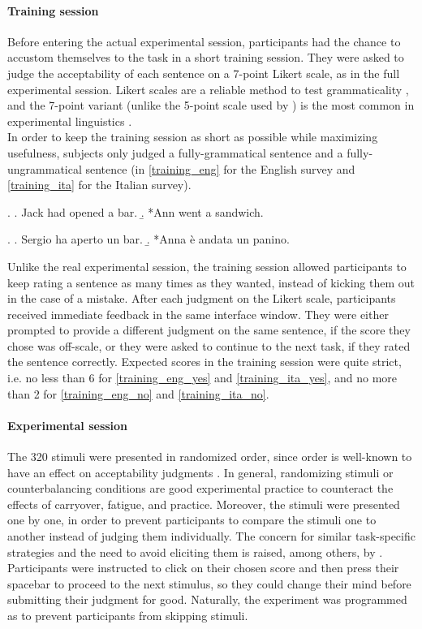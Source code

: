 \paragraph{Training session} Before entering the actual experimental session, participants had the chance to accustom themselves to the task in a short training session. They were asked to judge the acceptability of each sentence on a 7-point Likert scale, as in the full experimental session. Likert scales are a reliable method to test grammaticality \parencite{WeskottFanselow2011}, and the 7-point variant (unlike the 5-point scale used by \textcite{Medina2007}) is the most common in experimental linguistics \parencite{Juzek2016}.\\ In order to keep the training session as short as possible while maximizing usefulness, subjects only judged a fully-grammatical sentence and a fully-ungrammatical sentence (in \ref{training_eng} for the English survey and \ref{training_ita} for the Italian survey).

\ex. \label{training_eng} \a. \label{training_eng_yes} Jack had opened a bar.
\b. \label{training_eng_no} *Ann went a sandwich.

\ex. \label{training_ita} \a. \label{training_ita_yes} Sergio ha aperto un bar.
\b. \label{training_ita_no} *Anna è andata un panino.

Unlike the real experimental session, the training session allowed participants to keep rating a sentence as many times as they wanted, instead of kicking them out in the case of a mistake. After each judgment on the Likert scale, participants received immediate feedback in the same interface window. They were either prompted to provide a different judgment on the same sentence, if the score they chose was off-scale, or they were asked to continue to the next task, if they rated the sentence correctly. Expected scores in the training session were quite strict, i.e. no less than 6 for \ref{training_eng_yes} and \ref{training_ita_yes}, and no more than 2 for \ref{training_eng_no} and \ref{training_ita_no}.

\paragraph{Experimental session} The 320 stimuli were presented in randomized order, since order is well-known to have an effect on acceptability judgments \parencite{Myers2009, Juzek2016}. In general, randomizing stimuli or counterbalancing conditions are good experimental practice to counteract the effects of carryover, fatigue, and practice. Moreover, the stimuli were presented one by one, in order to prevent participants to compare the stimuli one to another instead of judging them individually. The concern for similar task-specific strategies and the need to avoid eliciting them is raised, among others, by \textcite{Myers2009}.\\
Participants were instructed to click on their chosen score and then press their spacebar to proceed to the next stimulus, so they could change their mind before submitting their judgment for good. Naturally, the experiment was programmed as to prevent participants from skipping stimuli.


